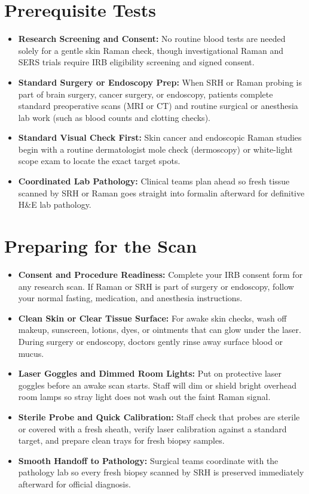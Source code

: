\section{Prerequisite Tests}
\begin{itemize}
  \item \textbf{Research Screening and Consent:} No routine blood tests are needed solely for a gentle skin Raman check, though investigational Raman and SERS trials require IRB eligibility screening and signed consent.
  \item \textbf{Standard Surgery or Endoscopy Prep:} When SRH or Raman probing is part of brain surgery, cancer surgery, or endoscopy, patients complete standard preoperative scans (MRI or CT) and routine surgical or anesthesia lab work (such as blood counts and clotting checks).
  \item \textbf{Standard Visual Check First:} Skin cancer and endoscopic Raman studies begin with a routine dermatologist mole check (dermoscopy) or white-light scope exam to locate the exact target spots.
  \item \textbf{Coordinated Lab Pathology:} Clinical teams plan ahead so fresh tissue scanned by SRH or Raman goes straight into formalin afterward for definitive H\&E lab pathology.
\end{itemize}

\section{Preparing for the Scan}
\begin{itemize}
  \item \textbf{Consent and Procedure Readiness:} Complete your IRB consent form for any research scan. If Raman or SRH is part of surgery or endoscopy, follow your normal fasting, medication, and anesthesia instructions.
  \item \textbf{Clean Skin or Clear Tissue Surface:} For awake skin checks, wash off makeup, sunscreen, lotions, dyes, or ointments that can glow under the laser. During surgery or endoscopy, doctors gently rinse away surface blood or mucus.
  \item \textbf{Laser Goggles and Dimmed Room Lights:} Put on protective laser goggles before an awake scan starts. Staff will dim or shield bright overhead room lamps so stray light does not wash out the faint Raman signal.
  \item \textbf{Sterile Probe and Quick Calibration:} Staff check that probes are sterile or covered with a fresh sheath, verify laser calibration against a standard target, and prepare clean trays for fresh biopsy samples.
  \item \textbf{Smooth Handoff to Pathology:} Surgical teams coordinate with the pathology lab so every fresh biopsy scanned by SRH is preserved immediately afterward for official diagnosis.
\end{itemize}

